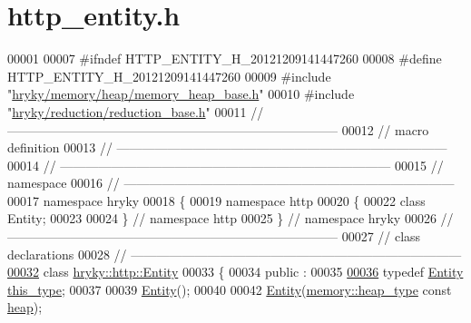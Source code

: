 \hypertarget{http__entity_8h_source}{\section{http\-\_\-entity.\-h}
}

\begin{DoxyCode}
00001 
00007 \textcolor{preprocessor}{#ifndef HTTP\_ENTITY\_H\_20121209141447260}
00008 \textcolor{preprocessor}{}\textcolor{preprocessor}{#define HTTP\_ENTITY\_H\_20121209141447260}
00009 \textcolor{preprocessor}{}\textcolor{preprocessor}{#include "\hyperlink{memory__heap__base_8h}{hryky/memory/heap/memory_heap_base.h}"}
00010 \textcolor{preprocessor}{#include "\hyperlink{reduction__base_8h}{hryky/reduction/reduction_base.h}"}
00011 \textcolor{comment}{//
      ------------------------------------------------------------------------------}
00012 \textcolor{comment}{// macro definition}
00013 \textcolor{comment}{//
      ------------------------------------------------------------------------------}
00014 \textcolor{comment}{//
      ------------------------------------------------------------------------------}
00015 \textcolor{comment}{// namespace}
00016 \textcolor{comment}{//
      ------------------------------------------------------------------------------}
00017 \textcolor{keyword}{namespace }hryky
00018 \{
00019 \textcolor{keyword}{namespace }http
00020 \{
00022     \textcolor{keyword}{class }Entity;
00023 
00024 \} \textcolor{comment}{// namespace http}
00025 \} \textcolor{comment}{// namespace hryky}
00026 \textcolor{comment}{//
      ------------------------------------------------------------------------------}
00027 \textcolor{comment}{// class declarations}
00028 \textcolor{comment}{//
      ------------------------------------------------------------------------------}
\hypertarget{http__entity_8h_source_l00032}{}\hyperlink{classhryky_1_1http_1_1_entity}{00032} \textcolor{comment}{}\textcolor{keyword}{class }\hyperlink{classhryky_1_1http_1_1_entity}{hryky::http::Entity}
00033 \{
00034 \textcolor{keyword}{public} :
00035 
\hypertarget{http__entity_8h_source_l00036}{}\hyperlink{classhryky_1_1http_1_1_entity_a4afcdfef1cb6784f4dca15a9379e507f}{00036}     \textcolor{keyword}{typedef} \hyperlink{classhryky_1_1http_1_1_entity}{Entity} \hyperlink{classhryky_1_1http_1_1_entity_a4afcdfef1cb6784f4dca15a9379e507f}{this_type};
00037 
00039     \hyperlink{classhryky_1_1http_1_1_entity_add41c964efc3356d4606780b1533bc67}{Entity}();
00040 
00042     \hyperlink{classhryky_1_1http_1_1_entity_add41c964efc3356d4606780b1533bc67}{Entity}(\hyperlink{classhryky_1_1memory_1_1heap_1_1_base}{memory::heap_type} \textcolor{keyword}{const} \hyperlink{namespacehryky_1_1memory_1_1global_a6fc6103f67c837aa0f39b359588409cd}{heap});

\end{DoxyCode}
